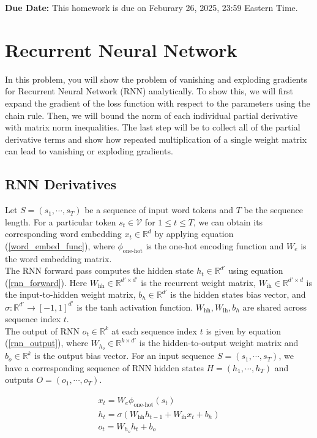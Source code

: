 \documentclass{article}
\theoremstyle{case}
\theoremstyle{definition}
\begin{document}
\textbf{Due Date:} This homework is due on Feburary 26, 2025, 23:59 Eastern Time.  


\section{Recurrent Neural Network}
In this problem, you will show the problem of vanishing and exploding gradients for Recurrent Neural Network (RNN) analytically. To show this, we will first expand the gradient of the loss function with respect to the parameters using the chain rule. Then, we will bound the norm of each individual partial derivative with matrix norm inequalities. The last step will be to collect all of the partial derivative terms and show how repeated multiplication of a single weight matrix can lead to vanishing or exploding gradients. 

\subsection{RNN Derivatives}

Let $S=(s_1,\cdots,s_T)$ be a sequence of input word tokens and $T$ be the sequence length. For a particular token $s_t\in \mathcal{V}$ for $1\leq t\leq T$, we can obtain its corresponding word embedding $x_t\in\mathbb{R}^{d}$ by applying equation (\ref{word_embed_func}), where $\phi_{\text{one-hot}}$ is the one-hot encoding function and $W_e$ is the word embedding matrix. \\

The RNN forward pass computes the hidden state $h_t\in\mathbb{R}^{d'}$ using equation (\ref{rnn_forward}). Here $W_{\text{hh}}\in\mathbb{R}^{d'\times d'}$ is the recurrent weight matrix,  $W_{\text{ih}}\in\mathbb{R}^{d'\times d}$ is the input-to-hidden weight matrix, $b_h\in\mathbb{R}^{d'}$ is the hidden states bias vector, and $\sigma:\mathbb{R}^{d'}\to[-1,1]^{d'}$ is the tanh activation function. $W_{\text{hh}},W_{\text{ih}},b_h$ are shared across sequence index $t$.\\

The output of RNN $o_t\in\mathbb{R}^{k}$ at each sequence index $t$ is given by equation (\ref{rnn_output}), where $W_{h_o}\in\mathbb{R}^{k\times d'}$ is the hidden-to-output weight matrix and $b_o\in\mathbb{R}^{k}$ is the output bias vector. For an input sequence $S=(s_1,\cdots,s_T)$, we have a corresponding sequence of RNN hidden states  $H=(h_1,\cdots,h_T)$ and outputs $O=(o_1,\cdots,o_T)$.

\begin{align}
    x_t=W_e\phi_{\text{one-hot}}(s_t)\label{word_embed_func}\\
    h_t=\sigma(W_{\text{hh}}h_{t-1}+W_{\text{ih}}x_t+b_h)\label{rnn_forward}\\
    o_t=W_{h_o}h_t+b_o\label{rnn_output}
\end{align}
\end{document}
